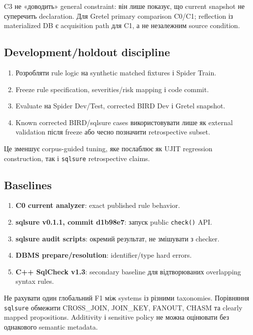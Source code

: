 \documentclass[11pt,a4paper]{article}
\begin{document}
C3 не «доводить» general constraint: він лише показує, що current snapshot не
суперечить declaration. Для Gretel primary comparison C0/C1; reflection із
materialized DB є acquisition path для C1, а не незалежним source condition.

\subsection{Development/holdout discipline}

\begin{enumerate}
\item Розробляти rule logic на synthetic matched fixtures і Spider Train.
\item Freeze rule specification, severities/risk mapping і code commit.
\item Evaluate на Spider Dev/Test, corrected BIRD Dev і Gretel snapshot.
\item Known corrected BIRD/sqlsure cases використовувати лише як external validation
      після freeze або чесно позначити retrospective subset.
\end{enumerate}

Це зменшує corpus-guided tuning, яке послаблює як UJIT regression construction, так і
\texttt{sqlsure} retrospective claims.

\subsection{Baselines}

\begin{enumerate}
\item \textbf{C0 current analyzer}: exact published rule behavior.
\item \textbf{sqlsure v0.1.1, commit d1b98e7}: запуск public \texttt{check()} API.
\item \textbf{sqlsure audit scripts}: окремий результат, не змішувати з checker.
\item \textbf{DBMS prepare/resolution}: identifier/type hard errors.
\item \textbf{C++ SqlCheck v1.3}: secondary baseline для відтворюваних overlapping
      syntax rules.
\end{enumerate}

\begin{warningbox}
Не рахувати один глобальний F1 між systems із різними taxonomies. Порівняння
\texttt{sqlsure} обмежити CROSS\_JOIN, JOIN\_KEY, FANOUT, CHASM та clearly mapped
propositions. Additivity і sensitive policy не можна оцінювати без однакового
semantic metadata.
\end{warningbox}
\end{document}
